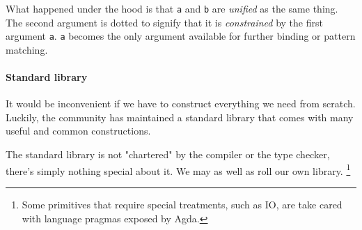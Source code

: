 \documentclass[../thesis.tex]{subfiles}
\begin{document}
What happened under the hood is that {\lstinline|a|} and {\lstinline|b|} are
\textit{unified} as the same thing. The second argument is dotted to signify that
it is \textit{constrained} by the first argument {\lstinline|a|}. {\lstinline|a|}
becomes the only argument available for further binding or pattern matching.

\paragraph{Standard library}

It would be inconvenient if we have to construct everything we need from scratch.
Luckily, the community has maintained a standard library that comes with many useful
and common constructions.

The standard library is not "chartered" by the compiler or the type checker,
there's simply nothing special about it. We may as well as roll our own library.
\footnote{Some primitives that require special treatments, such as IO, are take cared with 
language pragmas exposed  by Agda.}
\end{document}
